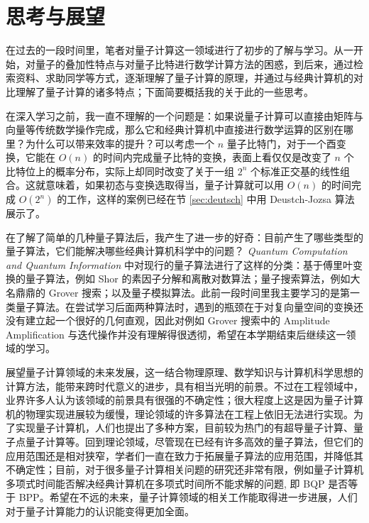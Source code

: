 \section{思考与展望}

在过去的一段时间里，笔者对量子计算这一领域进行了初步的了解与学习。从一开始，对量子的叠加性特点与对量子比特进行数学计算方法的困惑，到后来，通过检索资料、求助同学等方式，逐渐理解了量子计算的原理，并通过与经典计算机的对比理解了量子计算的诸多特点；下面简要概括我的关于此的一些思考。

在深入学习之前，我一直不理解的一个问题是：如果说量子计算可以直接由矩阵与向量等传统数学操作完成，那么它和经典计算机中直接进行数学运算的区别在哪里？为什么可以带来效率的提升？可以考虑一个 $n$ 量子比特门，对于一个酉变换，它能在 $O(n)$ 的时间内完成量子比特的变换，表面上看仅仅是改变了 $n$ 个比特位上的概率分布，实际上却同时改变了关于一组 $2^n$ 个标准正交基的线性组合。这就意味着，如果初态与变换选取得当，量子计算就可以用 $O(n)$ 的时间完成 $O(2^n)$ 的工作，这样的案例已经在节 \ref{sec:deutsch} 中用 Deustch-Jozsa 算法展示了。

在了解了简单的几种量子算法后，我产生了进一步的好奇：目前产生了哪些类型的量子算法，它们能解决哪些经典计算机科学中的问题？\textit{ Quantum Computation and Quantum Information}\cite{nielsen2002quantum} 中对现行的量子算法进行了这样的分类：基于傅里叶变换的量子算法，例如 Shor 的素因子分解和离散对数算法；量子搜索算法，例如大名鼎鼎的 Grover 搜索；以及量子模拟算法。此前一段时间里我主要学习的是第一类量子算法。在尝试学习后面两种算法时，遇到的瓶颈在于对复向量空间的变换还没有建立起一个很好的几何直观，因此对例如 Grover 搜索中的 Amplitude Amplification 与迭代操作并没有理解得很透彻，希望在本学期结束后继续这一领域的学习。

展望量子计算领域的未来发展，这一结合物理原理、数学知识与计算机科学思想的计算方法，能带来跨时代意义的进步，具有相当光明的前景。不过在工程领域中，业界许多人认为该领域的前景具有很强的不确定性；很大程度上这是因为量子计算机的物理实现进展较为缓慢，理论领域的许多算法在工程上依旧无法进行实现。为了实现量子计算机，人们也提出了多种方案，目前较为热门的有超导量子计算、量子点量子计算等。回到理论领域，尽管现在已经有许多高效的量子算法，但它们的应用范围还是相对狭窄，学者们一直在致力于拓展量子算法的应用范围，并降低其不确定性；目前，对于很多量子计算相关问题的研究还非常有限\cite{孙晓明2016量子计算若干前沿问题综述}，例如量子计算机多项式时间能否解决经典计算机在多项式时间所不能求解的问题, 即 BQP 是否等于 BPP。希望在不远的未来，量子计算领域的相关工作能取得进一步进展，人们对于量子计算能力的认识能变得更加全面。
